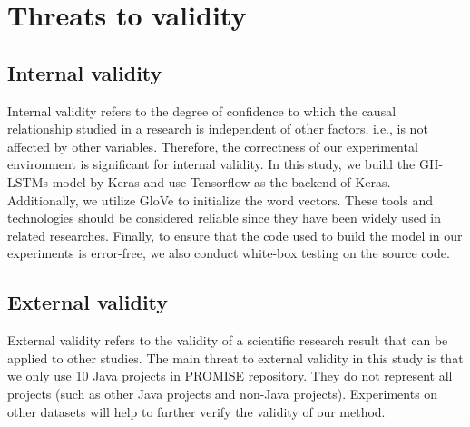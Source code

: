 \documentclass[journal]{IEEEtran}
\begin{document}
\section{Threats to validity}
\subsection{Internal validity}

Internal validity refers to the degree of confidence to which the causal relationship studied in a research is independent of other factors, i.e., is not affected by other variables. Therefore, the correctness of our experimental environment is significant for internal validity. In this study, we build the GH-LSTMs model by Keras and use Tensorflow as the backend of Keras. Additionally, we utilize GloVe to initialize the word vectors. These tools and technologies should be considered reliable since they have been widely used in related researches. Finally, to ensure that the code used to build the model in our experiments is error-free, we also conduct white-box testing on the source code.
\subsection{External validity}
External validity refers to the validity of a scientific research result that can be applied to other studies. The main threat to external validity in this study is that we only use 10 Java projects in PROMISE repository. They do not represent all projects (such as other Java projects and non-Java projects). Experiments on other datasets will help to further verify the validity of our method.
\end{document}
